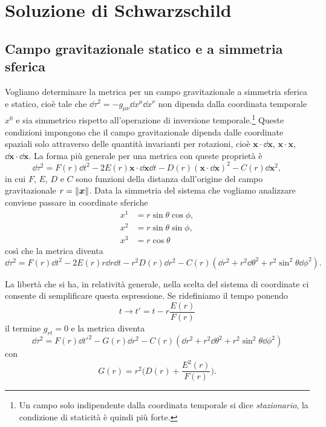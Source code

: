 \cleardoublepage
\chapter{Soluzione di Schwarzschild}
\label{cha:soluzione-sch}

\section{Campo gravitazionale statico e a simmetria sferica}
\label{sec:campo-statico-sferico}

Vogliamo determinare la metrica per un campo gravitazionale a simmetria sferica
e statico, cioè tale che $\dd\tau^{2} = -g_{\mu\nu}\dd x^{\mu}\dd x^{\nu}$ non
dipenda dalla coordinata temporale $x^{0}$ e sia simmetrico rispetto
all'operazione di inversione temporale.\footnote{Un campo solo indipendente
  dalla coordinata temporale si dice \emph{stazionario}, la condizione di
  staticità è quindi più forte.}  Queste condizioni impongono che il campo
gravitazionale dipenda dalle coordinate spaziali solo attraverso delle quantità
invarianti per rotazioni, cioè $\bm{x} \cdot \dd\bm{x}$, $\bm{x} \cdot \bm{x}$,
$\dd\bm{x} \cdot \dd\bm{x}$.  La forma più generale per una metrica con queste
proprietà è
\begin{equation}
  \dd\tau^{2} = F(r) \dd t^{2} - 2E(r) \bm{x} \cdot \dd\bm{x} \dd t -
  D(r)(\bm{x} \cdot \dd\bm{x})^{2} - C(r)\dd\bm{x}^{2},
\end{equation}
in cui $F$, $E$, $D$ e $C$ sono funzioni della distanza dall'origine del campo
gravitazionale $r = \lVert\bm{x}\rVert$.  Data la simmetria del sistema che vogliamo
analizzare conviene passare in coordinate sferiche
\begin{subequations}
  \begin{align}
    x^{1} &= r \sin\theta \cos\phi, \\
    x^{2} &= r \sin\theta \sin\phi, \\
    x^{3} &= r \cos\theta
  \end{align}
\end{subequations}
così che la metrica diventa
\begin{equation}
  \dd\tau^{2} = F(r) \dd t^{2} - 2E(r) r\dd r\dd t - r^{2}D(r)\dd r^{2} -
  C(r)(\dd r^{2} + r^{2}\dd\theta^{2} + r^{2}\sin^{2}\theta \dd\phi^{2}).
\end{equation}

La libertà che si ha, in relatività generale, nella scelta del sistema di
coordinate ci consente di semplificare questa espressione.  Se ridefiniamo il
tempo ponendo
\begin{equation}
  t \to t' = t - r\frac{E(r)}{F(r)}
\end{equation}
il termine $g_{rt}=0$ e la metrica diventa
\begin{equation}
  \dd \tau^{2} = F(r)\dd t'^{2} - G(r)\dd r^{2} -C(r)(\dd r^{2} +
  r^{2}\dd\theta^{2} + r^{2}\sin^{2}\theta \dd\phi^{2})
\end{equation}
con
\begin{equation}
  G(r) = r^{2} \bigg(D(r) + \frac{E^{2}(r)}{F(r)} \bigg).
\end{equation}

